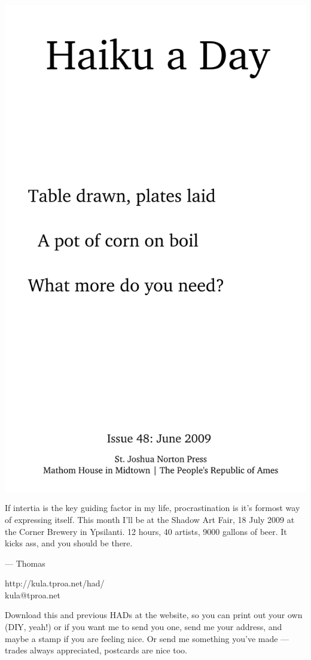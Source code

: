 \documentclass[12pt]{article}
\begin{document}
\includegraphics{frontpage.png}

\newpage

If intertia is the key guiding factor in my life, procrastination is 
it's formost way of expressing itself. This month I'll be at the
Shadow Art Fair, 18 July 2009 at the Corner Brewery in Ypsilanti.
12 hours, 40 artists, 9000 gallons of beer. It kicks ass, and you
should be there.

--- Thomas

http://kula.tproa.net/had/ \\
kula@tproa.net

Download this and previous HADs at the website, so you can
print out your own (DIY, yeah!) or if you want me to send
you one, send me your address, and maybe a stamp if you
are feeling nice. Or send me something you've made ---
trades always appreciated, postcards are nice too.
\end{document}
